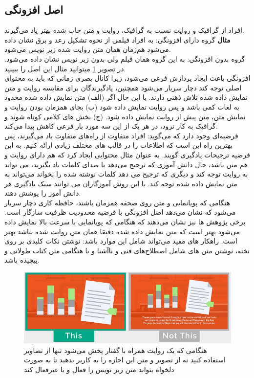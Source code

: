 \subsection{اصل افزونگی}
افراد از گرافیک و روایت نسبت به گرافیک، روایت و متن چاپ شده بهتر یاد می‌گیرند.
\\
\textbf{مثال}
گروه دارای افزونگی: به افراد فیلمی از نحوه تشکیل رعد و برق نشان داده می‌شود هم‌زمان همان متن روایت شده زیر نویس می‌شود.
\\
گروه بدون افزونگی: به این گروه همان فیلم ولی بدون زیر نویس نشان داده می‌شود. در تصویر
\ref{fig:redundancyexample}
ميتوانید مثال این اصل را ببینید.
\\ 
افزونگی باعث ایجاد پردازش فرعی می‌شود، زیرا کانال بصری زمانی که باید به محتوای اصلی توجه کند دچار سربار می‌شود همچنین، یادگیرندگان برای مقایسه روایت و متن نمایش داده شده تلاش ذهنی دارند. با این حال اگر (الف) متن نمایش داده شده محدود به لغات کمی باشد و پس روایت نمایش داده شود (ب) بجای همزمان بودن روایت و نمایش متن، متن پیش از روایت نمایش داده شود. (ج) بخش های کلامی کوتاه شوند و گرافیک به کار نرود، در هر یک از این سه مورد بار فرعی کاهش پیدا می‌کند.
\\
فرضیه‌ای وجود دارد که می‌گوید: افراد متفاوت از راه‌های متفاوت یاد می‌گیرند، پس بهترین راه این است که اطلاعات را در قالب های مختلف زیادی ارائه کنیم. به این فرضیه ترجیحات یادگیری
 گویند.
 به عنوان مثال محتوایی ایجاد کرد که هم دارای روایت و هم متن باشد،‌ حال دانش آموزی که ترجیح می‌دهد با صدای کلمات یاد بگیرید، می تواند به روایت توجه کند و دیگری که ترجیح می دهد کلمات نوشته شده را بخواند می‌تواند به متن نمایش داده شده توجه کند. با این روش آموزگاران می توانند سبک یادگیری
 هر دانش آموز را پوشش دهند.
 \\
 هنگامی که پویانمایی و متن روی صحفه همزمان باشند، حافظه کاری دچار سربار می‌شود که نشان می‌دهد اصل افزونگی با فرضیه محدودیت ظرفیت سازگار است. برخی پژوهش ها نیز نشان می‌دهند که هنگامی که پویانمایی با سرعت بالا نمایش داده می‌شود بهتر است که متن نمایش داده شده دقیقا همان متن روایت شده نباشد بهتر است.
 راهکار های  مفید می‌تواند شامل این موارد باشد: نوشتن نکات کلیدی بر روی تخته، نوشتن متن های شامل اصطلاح‌های‌ فنی و ناآشنا و یا هنگامی متن کتاب طولانی و پیچیده باشد.
\begin{figure}[htbp]
	\centering
	\includegraphics[width=0.7\linewidth]{figures/Redundancy_example}
	\caption[مثال اصل افزونگی]{هنگامی که یک روایت همراه با گفتار پخش می‌شود تنها از تصاویر استفاده کنید نه از تصویر و متن این اجازه را به کاربر بدهید تا به صورت دلخواه بتواند متن زیر نویس را فعال و یا غیرفعال کند}
	\label{fig:redundancyexample}
\end{figure}

